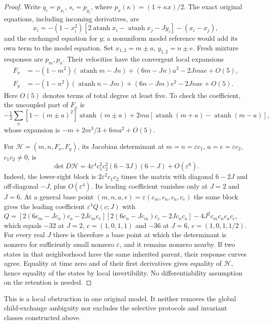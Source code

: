 \begin{proof}
Write $q_i=p_{x_i}$, $s_i=p_{y_i}$, where $p_x(\kappa)=(1+\kappa x)/2$. The exact original equations, including incoming derivatives, are
\begin{equation}
 \dot x_i=-(1-x_i^2)[2\operatorname{atanh}x_i-\operatorname{atanh}x_j-Jy_i]-(x_i-x_j),
 \label{eq:boundary-binary-flow}
\end{equation}
and the exchanged equation for $y$; a nonuniform model reference would add its own term to the model equation. Set $x_{1,2}=m\pm a$, $y_{1,2}=n\pm e$. Fresh mixture responses are $p_m,p_n$. Their velocities have the convergent local expansions
\begin{equation}
 \begin{aligned}
 F_x&=-(1-m^2)(\operatorname{atanh}m-Jn)+(6m-Jn)a^2-2Jmae+O(5),\\
 F_y&=-(1-n^2)(\operatorname{atanh}n-Jm)+(6n-Jm)e^2-2Jnae+O(5).
 \end{aligned}
 \label{eq:boundary-response-derivatives}
\end{equation}
Here $O(5)$ denotes terms of total degree at least five. To check the coefficient, the uncoupled part of $F_x$ is
\begin{equation}
 -\tfrac12\sum_{\pm}[1-(m\pm a)^2]\operatorname{atanh}(m\pm a)
 +2ma[\operatorname{atanh}(m+a)-\operatorname{atanh}(m-a)],
\end{equation}
whose expansion is $-m+2m^3/3+6ma^2+O(5)$.

For $\mathcal H=(m,n,F_x,F_y)$, its Jacobian determinant at $m=n=\varepsilon c_1$, $a=e=\varepsilon c_2$, $c_1c_2\ne0$, is
\begin{equation}
 \det D\mathcal H
 =4\varepsilon^4c_1^2c_2^2(6-3J)(6-J)+O(\varepsilon^6).
 \label{eq:boundary-observability-det}
\end{equation}
Indeed, the lower-right block is $2\varepsilon^2c_1c_2$ times the matrix with diagonal $6-2J$ and off-diagonal $-J$, plus $O(\varepsilon^4)$. Its leading coefficient vanishes only at $J=2$ and $J=6$. At a general base point $(m,n,a,e)=\varepsilon(c_m,c_n,c_a,c_e)$ the same block gives the leading coefficient $\varepsilon^4Q(c;J)$ with $Q=[2(6c_m-Jc_n)c_a-2Jc_mc_e][2(6c_n-Jc_m)c_e-2Jc_nc_a]-4J^2c_mc_nc_ac_e$, which equals $-32$ at $J=2$, $c=(1,0,1,1)$ and $-36$ at $J=6$, $c=(1,0,1,1/2)$. For every real $J$ there is therefore a base point at which the determinant is nonzero for sufficiently small nonzero $\varepsilon$, and it remains nonzero nearby. If two states in that neighborhood have the same inherited parent, their response curves agree. Equality at time zero and of their first derivatives gives equality of $\mathcal H$, hence equality of the states by local invertibility. No differentiability assumption on the retention is needed.
\end{proof}

This is a local obstruction in one original model. It neither removes the global child-exchange ambiguity nor excludes the selective protocols and invariant classes constructed above.
